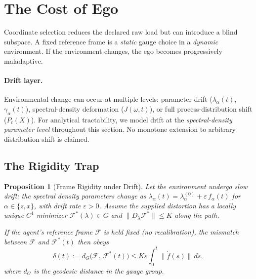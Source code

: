 \documentclass[12pt]{article}
\newtheorem{proposition}[theorem]{Proposition}
\begin{document}
\section{The Cost of Ego}
\label{sec:cost}

Coordinate selection reduces the declared raw load but can introduce a
blind subspace. A fixed reference frame is a \emph{static}
gauge choice in a \emph{dynamic} environment.
If the environment changes, the ego becomes progressively
maladaptive.

\paragraph{Drift layer.}
Environmental change can occur at multiple levels:
parameter drift ($\lambda_\alpha(t)$, $\gamma_\alpha(t)$),
spectral-density deformation ($J(\omega, t)$), or
full process-distribution shift ($P_t(X)$).
For analytical tractability, we model drift at the
\emph{spectral-density parameter level} throughout this
section.  No monotone extension to arbitrary distribution shift is
claimed.

\subsection{The Rigidity Trap}
\label{subsec:rigidity}

\begin{proposition}[Frame Rigidity under Drift]
\label{prop:rigidity}
Let the environment undergo slow drift: the spectral density
parameters change as
$\lambda_\alpha(t) = \lambda_\alpha^{(0)}
+ \varepsilon\,f_\alpha(t)$
for $\alpha \in \{z, x\}$, with drift rate
$\varepsilon > 0$.
Assume the supplied distortion has a locally unique $C^1$
minimizer $\mathcal{F}^*(\lambda)\in G$ and
$\lVert D_\lambda\mathcal F^*\rVert\leq K$ along the path.

If the agent's reference frame $\mathcal{F}$ is held fixed
(no recalibration), the mismatch between $\mathcal{F}$
and $\mathcal{F}^*(t)$ then obeys
\begin{equation}
\label{eq:mismatch}
\delta(t)
:= d_G\bigl(\mathcal{F},\, \mathcal{F}^*(t)\bigr)
\leq K\varepsilon \int_0^t \lVert\dot{f}(s)\rVert\,ds,
\end{equation}
where $d_G$ is the geodesic distance in the gauge group.
\end{proposition}
\end{document}
